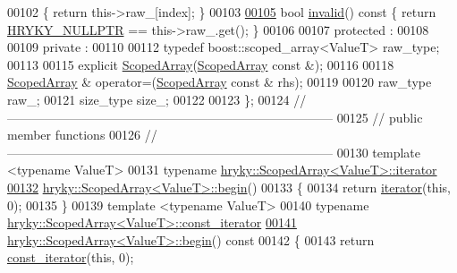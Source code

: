 \begin{DoxyCode}
00102     \{ \textcolor{keywordflow}{return} this->raw\_[index]; \}
00103 
\hypertarget{scoped__array_8h_source_l00105}{}\hyperlink{classhryky_1_1_scoped_array_a646755893596d518d733797e283de55e}{00105}     \textcolor{keywordtype}{bool} \hyperlink{classhryky_1_1_scoped_array_a646755893596d518d733797e283de55e}{invalid}()\textcolor{keyword}{ const }\{ \textcolor{keywordflow}{return} \hyperlink{common_8h_a4cd4ac09cfcdbd6b30ee69afc156e210}{HRYKY_NULLPTR} == this->raw\_.get(); \}
00106 
00107 \textcolor{keyword}{protected} :
00108 
00109 \textcolor{keyword}{private} :
00110 
00112     \textcolor{keyword}{typedef} boost::scoped\_array<ValueT>     raw\_type;
00113 
00115     \textcolor{keyword}{explicit} \hyperlink{classhryky_1_1_scoped_array_a4b93ba1d040033ef3bbdf6e5d61e9555}{ScopedArray}(\hyperlink{classhryky_1_1_scoped_array}{ScopedArray} \textcolor{keyword}{const} &);
00116 
00118     \hyperlink{classhryky_1_1_scoped_array}{ScopedArray} & operator=(\hyperlink{classhryky_1_1_scoped_array}{ScopedArray} \textcolor{keyword}{const} & rhs);
00119 
00120     raw\_type        raw\_;
00121     size\_type       size\_;
00122 
00123 \};
00124 \textcolor{comment}{//
      ------------------------------------------------------------------------------}
00125 \textcolor{comment}{// public member functions}
00126 \textcolor{comment}{//
      ------------------------------------------------------------------------------}
00130 \textcolor{comment}{}\textcolor{keyword}{template} <\textcolor{keyword}{typename} ValueT>
00131 \textcolor{keyword}{typename} \hyperlink{classhryky_1_1iterator_1_1random_1_1_mutable}{hryky::ScopedArray<ValueT>::iterator}
\hypertarget{scoped__array_8h_source_l00132}{}\hyperlink{classhryky_1_1_scoped_array_ad37d523c285b28838258c8f25d52292f}{00132} \hyperlink{classhryky_1_1_scoped_array_ad37d523c285b28838258c8f25d52292f}{hryky::ScopedArray<ValueT>::begin}()
00133 \{
00134     \textcolor{keywordflow}{return} \hyperlink{classhryky_1_1iterator_1_1random_1_1_mutable}{iterator}(\textcolor{keyword}{this}, 0);
00135 \}
00139 \textcolor{keyword}{template} <\textcolor{keyword}{typename} ValueT>
00140 \textcolor{keyword}{typename} \hyperlink{classhryky_1_1iterator_1_1random_1_1_immutable}{hryky::ScopedArray<ValueT>::const_iterator}
\hypertarget{scoped__array_8h_source_l00141}{}\hyperlink{classhryky_1_1_scoped_array_af46f44b3d660894ce184b8a46675c0df}{00141} \hyperlink{classhryky_1_1_scoped_array_ad37d523c285b28838258c8f25d52292f}{hryky::ScopedArray<ValueT>::begin}()\textcolor{keyword}{ const}
00142 \textcolor{keyword}{}\{
00143     \textcolor{keywordflow}{return} \hyperlink{classhryky_1_1iterator_1_1random_1_1_immutable}{const_iterator}(\textcolor{keyword}{this}, 0);

\end{DoxyCode}
